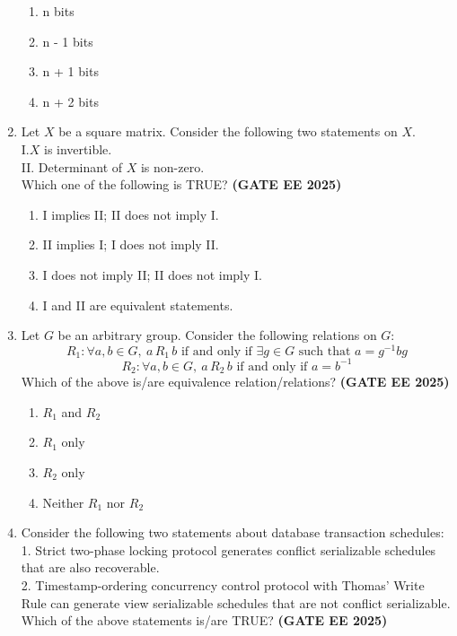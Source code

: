 \documentclass[journal,12pt,onecolumn]{IEEEtran}
\theoremstyle{remark}
\begin{document}
\begin{enumerate}
\begin{enumerate} 
\item n bits
\item n - 1 bits
\item n + 1 bits
\item n + 2 bits
\end{enumerate}

\item Let $X$ be a square matrix. Consider the following two statements on $X$.  \\

I.$X$ is invertible.  \\
II. Determinant of $X$ is non-zero.  \\

Which one of the following is TRUE? \hfill \textbf{(GATE EE 2025)}

\begin{enumerate} 
\item I implies II; II does not imply I.
\item II implies I; I does not imply II.
\item I does not imply II; II does not imply I.
\item I and II are equivalent statements.
\end{enumerate}

\item Let $G$ be an arbitrary group. Consider the following relations on $G$:  
\[
R_1: \forall a,b \in G, \ a \,R_1\, b \text{ if and only if } \exists g \in G \text{ such that } a = g^{-1} b g
\]  
\[
R_2: \forall a,b \in G, \ a \,R_2\, b \text{ if and only if } a = b^{-1}
\]
Which of the above is/are equivalence relation/relations? \hfill \textbf{(GATE EE 2025)}
 
\begin{enumerate}
    \item  $R_1$ and $R_2$
    \item  $R_1$ only
    \item  $R_2$ only
    \item  Neither $R_1$ nor $R_2$
\end{enumerate}

 

\item  Consider the following two statements about database transaction schedules:  \\
1. Strict two-phase locking protocol generates conflict serializable schedules that are also recoverable.\\
2. Timestamp-ordering concurrency control protocol with Thomas' Write Rule can generate view serializable schedules that are not conflict serializable.\\
Which of the above statements is/are TRUE?  \hfill \textbf{(GATE EE 2025)}


\end{enumerate}
\end{document}
